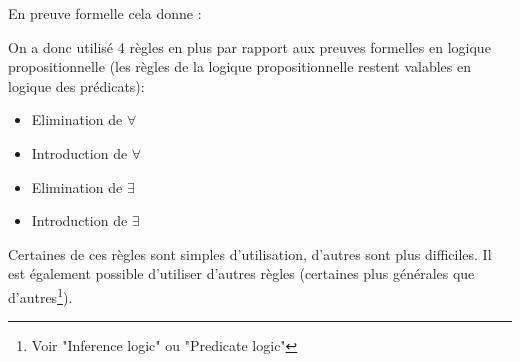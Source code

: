En preuve formelle cela donne :

\begin{center}
\end{center}

On a donc utilisé 4 règles en plus par rapport aux preuves formelles en logique propositionnelle (les règles de la logique propositionnelle restent valables en logique des prédicats):
\begin{itemize}
\item Elimination de $\forall$
\item Introduction de $\forall$
\item Elimination de $\exists$
\item Introduction de $\exists$
\end{itemize}

Certaines de ces règles sont simples d'utilisation, d'autres sont plus difficiles. Il est également possible d'utiliser d'autres règles (certaines plus générales que d'autres\footnote{Voir "Inference logic" ou "Predicate logic"}).

